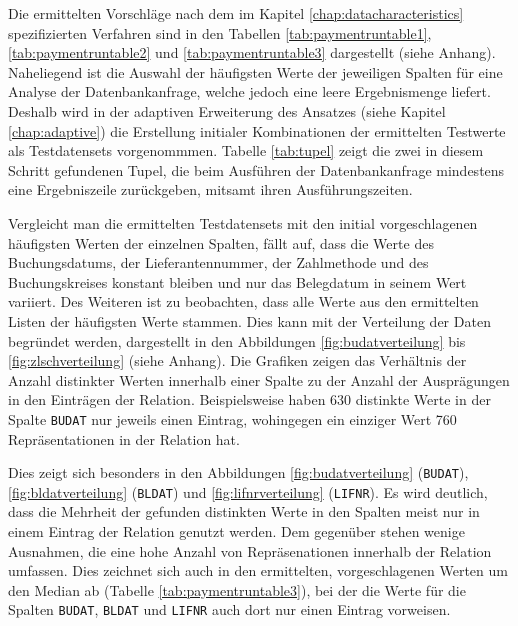Die ermittelten Vorschläge nach dem im Kapitel \ref{chap:datacharacteristics} spezifizierten Verfahren sind in den Tabellen \ref{tab:paymentruntable1}, \ref{tab:paymentruntable2} und \ref{tab:paymentruntable3} dargestellt (siehe Anhang).
Naheliegend ist die Auswahl der häufigsten Werte der jeweiligen Spalten für eine Analyse der Datenbankanfrage, welche jedoch eine leere Ergebnismenge liefert.
Deshalb wird in der adaptiven Erweiterung des Ansatzes (siehe Kapitel \ref{chap:adaptive}) die Erstellung initialer Kombinationen der ermittelten Testwerte als Testdatensets vorgenommmen.
Tabelle \ref{tab:tupel} zeigt die zwei in diesem Schritt gefundenen Tupel, die beim Ausführen der Datenbankanfrage mindestens eine Ergebniszeile zurückgeben, mitsamt ihren Ausführungszeiten.
\begin{table}[h]
	\centering
	\caption{Gefundene Tupel für Testdatensets}
	\label{tab:tupel}
\end{table}

Vergleicht man die ermittelten Testdatensets mit den initial vorgeschlagenen häufigsten Werten der einzelnen Spalten, fällt auf, dass die Werte des Buchungsdatums, der Lieferantennummer, der Zahlmethode und des Buchungskreises konstant bleiben und nur das Belegdatum in seinem Wert variiert.
Des Weiteren ist zu beobachten, dass alle Werte aus den ermittelten Listen der häufigsten Werte stammen.
Dies kann mit der Verteilung der Daten begründet werden, dargestellt in den Abbildungen \ref{fig:budatverteilung} bis \ref{fig:zlschverteilung} (siehe Anhang).
Die Grafiken zeigen das Verhältnis der Anzahl distinkter Werten innerhalb einer Spalte zu der Anzahl der Ausprägungen in den Einträgen der Relation.
Beispielsweise haben 630 distinkte Werte in der Spalte \texttt{BUDAT} nur jeweils einen Eintrag, wohingegen ein einziger Wert 760 Repräsentationen in der Relation hat.

Dies zeigt sich besonders in den Abbildungen \ref{fig:budatverteilung} (\texttt{BUDAT}), \ref{fig:bldatverteilung} (\texttt{BLDAT}) und \ref{fig:lifnrverteilung} (\texttt{LIFNR}).
Es wird deutlich, dass die Mehrheit der gefunden distinkten Werte in den Spalten meist nur in einem Eintrag der Relation genutzt werden.
Dem gegenüber stehen wenige Ausnahmen, die eine hohe Anzahl von Repräsenationen innerhalb der Relation umfassen.
Dies zeichnet sich auch in den ermittelten, vorgeschlagenen Werten um den Median ab (Tabelle \ref{tab:paymentruntable3}), bei der die Werte für die Spalten \texttt{BUDAT}, \texttt{BLDAT} und \texttt{LIFNR} auch dort nur einen Eintrag vorweisen.

